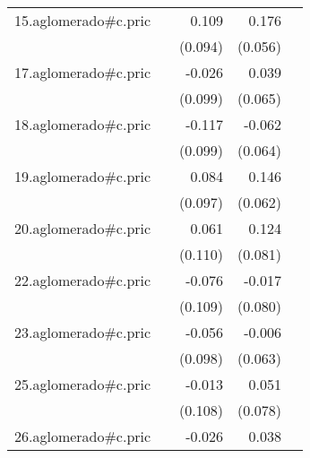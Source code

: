 {\begin{longtable}{l*{4}{D{.}{.}{-1}}}
\addlinespace
15.aglomerado#c.pric&                     &       0.109         &       0.176\sym{**} &                     \\
            &                     &     (0.094)         &     (0.056)         &                     \\
\addlinespace
17.aglomerado#c.pric&                     &      -0.026         &       0.039         &                     \\
            &                     &     (0.099)         &     (0.065)         &                     \\
\addlinespace
18.aglomerado#c.pric&                     &      -0.117         &      -0.062         &                     \\
            &                     &     (0.099)         &     (0.064)         &                     \\
\addlinespace
19.aglomerado#c.pric&                     &       0.084         &       0.146\sym{*}  &                     \\
            &                     &     (0.097)         &     (0.062)         &                     \\
\addlinespace
20.aglomerado#c.pric&                     &       0.061         &       0.124         &                     \\
            &                     &     (0.110)         &     (0.081)         &                     \\
\addlinespace
22.aglomerado#c.pric&                     &      -0.076         &      -0.017         &                     \\
            &                     &     (0.109)         &     (0.080)         &                     \\
\addlinespace
23.aglomerado#c.pric&                     &      -0.056         &      -0.006         &                     \\
            &                     &     (0.098)         &     (0.063)         &                     \\
\addlinespace
25.aglomerado#c.pric&                     &      -0.013         &       0.051         &                     \\
            &                     &     (0.108)         &     (0.078)         &                     \\
\addlinespace
26.aglomerado#c.pric&                     &      -0.026         &       0.038         &                     \\

\end{longtable}}
